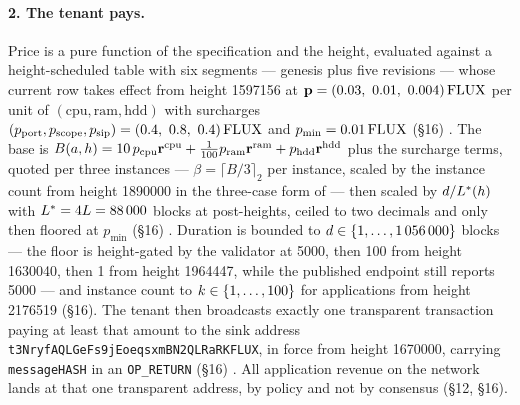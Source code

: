 \paragraph{2. The tenant pays.}
Price is a pure function of the specification and the height, evaluated against a height-scheduled
table with six segments --- genesis plus five revisions --- whose current row takes effect from
height \num{1597156} at $\pricevec = (0.03,\ 0.01,\ 0.004)\flux$ per unit of
$(\mathrm{cpu}, \mathrm{ram}, \mathrm{hdd})$ with surcharges
$(p_{\mathrm{port}}, p_{\mathrm{scope}}, p_{\mathrm{sip}}) = (0.4,\ 0.8,\ 0.4)\,\mathrm{FLUX}$ and
$p_{\min} = 0.01\,\mathrm{FLUX}$ (\S16) .
The base is $B(a,h) = 10\,p_{\mathrm{cpu}}\mathbf{r}^{\mathrm{cpu}} +
\tfrac{1}{100}p_{\mathrm{ram}}\mathbf{r}^{\mathrm{ram}} + p_{\mathrm{hdd}}\mathbf{r}^{\mathrm{hdd}}$ plus
the surcharge terms, quoted per three instances --- $\beta = \lceil B/3 \rceil_2$ per instance,
scaled by the instance count from height \num{1890000} in the three-case form of 
--- then scaled by $d/L^{\ast}(h)$ with $L^{\ast} = 4L = \num{88000}$ blocks at
post-\PoN heights, ceiled to two decimals and only then floored at $p_{\min}$
(\S16) 
. Duration is bounded to
$d \in \{\num{1},\dots,\num{1056000}\}$ blocks --- the floor is height-gated by the validator at
\num{5000}, then \num{100} from height \num{1630040}, then \num{1} from height \num{1964447}, while
the published endpoint still reports \num{5000}
 --- and instance count to
$k \in \{\num{1},\dots,\num{100}\}$ for  applications from height \num{2176519}
(\S16). The tenant then broadcasts exactly one transparent transaction paying at least that amount to
the sink address \texttt{t3Nryf\allowbreak{}AQLGe\allowbreak{}Fs9j\allowbreak{}Eoeqsxm\allowbreak{}BN2QLRa\allowbreak{}RKFLUX}, in force from height \num{1670000},
carrying \texttt{messageHASH} in an \texttt{OP\_RETURN} (\S16)
. All application revenue on the network lands at
that one transparent address, by policy and not by consensus (\S12, \S16).

